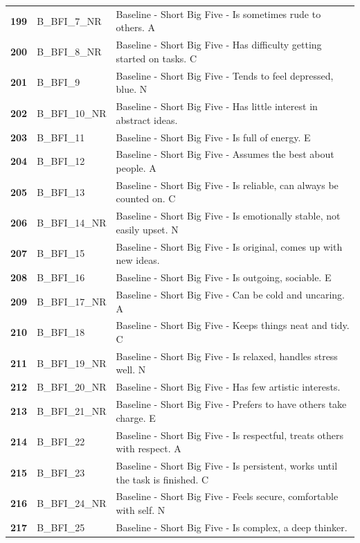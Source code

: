 \documentclass[
  letterpaper,
  DIV=11,
  numbers=noendperiod]{scrartcl}
\begin{document}
\begin{longtable}[t]{>{}cll}
\textbf{199} & B\_BFI\_7\_NR & Baseline - Short Big Five - Is sometimes rude to others. A\\
\textbf{200} & B\_BFI\_8\_NR & Baseline - Short Big Five - Has difficulty getting started on tasks. C\\
\addlinespace
\textbf{201} & B\_BFI\_9 & Baseline - Short Big Five - Tends to feel depressed, blue. N\\
\textbf{202} & B\_BFI\_10\_NR & Baseline - Short Big Five - Has little interest in abstract ideas.\\
\textbf{203} & B\_BFI\_11 & Baseline - Short Big Five - Is full of energy. E\\
\textbf{204} & B\_BFI\_12 & Baseline - Short Big Five - Assumes the best about people. A\\
\textbf{205} & B\_BFI\_13 & Baseline - Short Big Five - Is reliable, can always be counted on. C\\
\addlinespace
\textbf{206} & B\_BFI\_14\_NR & Baseline - Short Big Five - Is emotionally stable, not easily upset. N\\
\textbf{207} & B\_BFI\_15 & Baseline - Short Big Five - Is original, comes up with new ideas.\\
\textbf{208} & B\_BFI\_16 & Baseline - Short Big Five - Is outgoing, sociable. E\\
\textbf{209} & B\_BFI\_17\_NR & Baseline - Short Big Five - Can be cold and uncaring. A\\
\textbf{210} & B\_BFI\_18 & Baseline - Short Big Five - Keeps things neat and tidy. C\\
\addlinespace
\textbf{211} & B\_BFI\_19\_NR & Baseline - Short Big Five - Is relaxed, handles stress well. N\\
\textbf{212} & B\_BFI\_20\_NR & Baseline - Short Big Five - Has few artistic interests.\\
\textbf{213} & B\_BFI\_21\_NR & Baseline - Short Big Five - Prefers to have others take charge. E\\
\textbf{214} & B\_BFI\_22 & Baseline - Short Big Five - Is respectful, treats others with respect. A\\
\textbf{215} & B\_BFI\_23 & Baseline - Short Big Five - Is persistent, works until the task is finished. C\\
\addlinespace
\textbf{216} & B\_BFI\_24\_NR & Baseline - Short Big Five - Feels secure, comfortable with self. N\\
\textbf{217} & B\_BFI\_25 & Baseline - Short Big Five - Is complex, a deep thinker.\\

\end{longtable}
\end{document}
